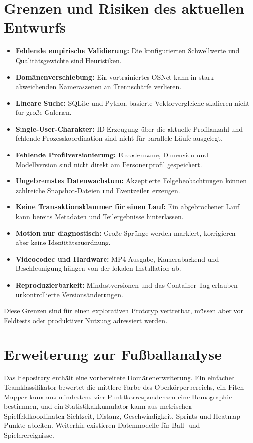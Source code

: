 \documentclass[runningheads]{llncs}
\begin{document}
\section{Grenzen und Risiken des aktuellen Entwurfs}

\begin{itemize}
\item \textbf{Fehlende empirische Validierung:} Die konfigurierten Schwellwerte und Qualitätsgewichte sind Heuristiken.
\item \textbf{Domänenverschiebung:} Ein vortrainiertes OSNet kann in stark abweichenden Kameraszenen an Trennschärfe verlieren.
\item \textbf{Lineare Suche:} SQLite und Python-basierte Vektorvergleiche skalieren nicht für große Galerien.
\item \textbf{Single-User-Charakter:} ID-Erzeugung über die aktuelle Profilanzahl und fehlende Prozesskoordination sind nicht für parallele Läufe ausgelegt.
\item \textbf{Fehlende Profilversionierung:} Encodername, Dimension und Modellversion sind nicht direkt am Personenprofil gespeichert.
\item \textbf{Ungebremstes Datenwachstum:} Akzeptierte Folgebeobachtungen können zahlreiche Snapshot-Dateien und Eventzeilen erzeugen.
\item \textbf{Keine Transaktionsklammer für einen Lauf:} Ein abgebrochener Lauf kann bereits Metadaten und Teilergebnisse hinterlassen.
\item \textbf{Motion nur diagnostisch:} Große Sprünge werden markiert, korrigieren aber keine Identitätszuordnung.
\item \textbf{Videocodec und Hardware:} MP4-Ausgabe, Kamerabackend und Beschleunigung hängen von der lokalen Installation ab.
\item \textbf{Reproduzierbarkeit:} Mindestversionen und das Container-Tag  erlauben unkontrollierte Versionsänderungen.
\end{itemize}

Diese Grenzen sind für einen explorativen Prototyp vertretbar, müssen aber vor Feldtests oder produktiver Nutzung adressiert werden.

\section{Erweiterung zur Fußballanalyse}

Das Repository enthält eine vorbereitete Domänenerweiterung. Ein einfacher Teamklassifikator bewertet die mittlere Farbe des Oberkörperbereichs, ein Pitch-Mapper kann aus mindestens vier Punktkorrespondenzen eine Homographie bestimmen, und ein Statistikakkumulator kann aus metrischen Spielfeldkoordinaten Sichtzeit, Distanz, Geschwindigkeit, Sprints und Heatmap-Punkte ableiten. Weiterhin existieren Datenmodelle für Ball- und Spielerereignisse.
\end{document}
